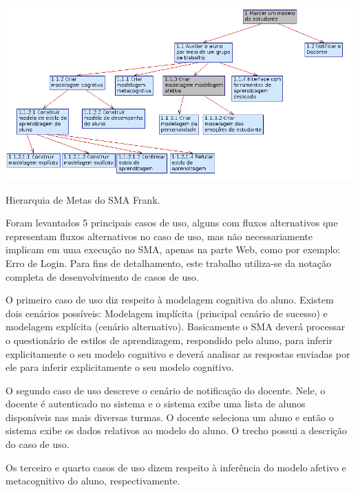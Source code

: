 \begin{table}
	\centering
	\includegraphics[scale=0.8]{images/metas-frank.png}
	\caption{Hierarquia de Metas do SMA Frank.}
	\label{fig:metas-frank}
\end{table}

Foram levantados 5 principais casos de uso, alguns com fluxos alternativos que representam fluxos alternativos no caso de uso, mas não necessariamente implicam em uma execução no SMA, apenas na parte Web, como por exemplo: Erro de Login. Para fins de detalhamento, este trabalho utiliza-se da notação completa de desenvolvimento de casos de uso.

O primeiro caso de uso diz respeito à modelagem cognitiva do aluno. Existem dois cenários possíveis: Modelagem implícita (principal cenário de sucesso) e modelagem explícita (cenário alternativo). Basicamente o SMA deverá processar o questionário de estilos de aprendizagem, respondido pelo aluno, para inferir explicitamente o seu modelo cognitivo e deverá analisar as respostas enviadas por ele para inferir explicitamente o seu modelo cognitivo.



O segundo caso de uso descreve o cenário de notificação do docente. Nele, o docente é autenticado no sistema e o sistema exibe uma lista de alunos disponíveis nas mais diversas turmas. O docente seleciona um aluno e então o sistema exibe os dados relativos ao modelo do aluno. O trecho possui a descrição do caso de uso.



Os terceiro e quarto casos de uso dizem respeito à inferência do modelo afetivo e metacognitivo do aluno, respectivamente.





